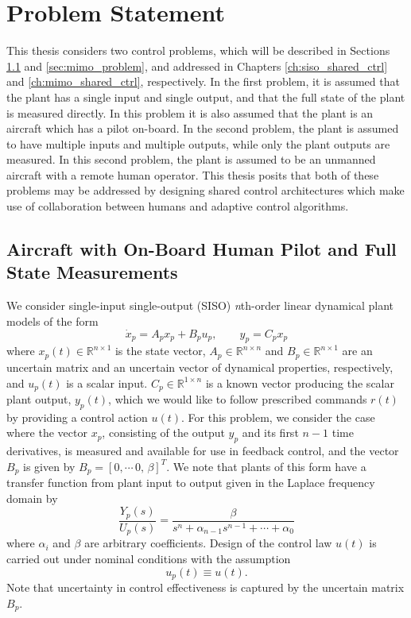 \chapter{Problem Statement} \label{ch:problem}

This thesis considers two control problems, which will be described in Sections \ref{sec:siso_problem} and \ref{sec:mimo_problem}, and addressed in Chapters \ref{ch:siso_shared_ctrl} and \ref{ch:mimo_shared_ctrl}, respectively. In the first problem, it is assumed that the plant has a single input and single output, and that the full state of the plant is measured directly. In this problem it is also assumed that the plant is an aircraft which has a pilot on-board. In the second problem, the plant is assumed to have multiple inputs and multiple outputs, while only the plant outputs are measured. In this second problem, the plant is assumed to be an unmanned aircraft with a remote human operator. This thesis posits that both of these problems may be addressed by designing shared control architectures which make use of collaboration between humans and adaptive control algorithms.

\section{Aircraft with On-Board Human Pilot and Full State Measurements} \label{sec:siso_problem}

We consider single-input single-output (SISO) \textit{n}th-order linear dynamical plant models of the form 
\begin{equation}
\dot x_p = A_p x_p + B_p u_p	, \qquad y_p = C_p x_p \label{eq:siso_plant}
\end{equation} 
\noindent where $x_p(t) \in \mathbb{R}^{n \times 1}$ is the state vector, $A_p \in \mathbb{R}^{n \times n}$ and $B_p \in \mathbb{R}^{n \times 1}$ are an uncertain matrix and an uncertain vector of dynamical properties, respectively, and $u_p(t)$ is a scalar input. $C_p \in \mathbb{R}^{1 \times n}$ is a known vector producing the scalar plant output, $y_p(t)$, which we would like to follow prescribed commands $r(t)$ by providing a control action $u(t)$. For this problem, we consider the case where the vector $x_p$, consisting of the output $y_p$ and its first $n-1$ time derivatives, is measured and available for use in feedback control, and the vector $B_p$ is given by $B_p = [0, \cdots \, 0, \, \beta]^T$. We note that plants of this form have a transfer function from plant input to output given in the Laplace frequency domain by
\begin{equation}
\frac{Y_p(s)}{U_p(s)} = \frac{\beta}{s^n + \alpha_{n-1} s^{n-1} + \cdots + \alpha_0}	
\end{equation}
where $\alpha_i$ and $\beta$ are arbitrary coefficients. Design of the control law $u(t)$ is carried out under nominal conditions with the assumption
\begin{equation}
	u_p(t) \equiv u(t). \label{eq:siso_plant_input_nom}
\end{equation}
Note that uncertainty in control effectiveness is captured by the uncertain matrix $B_p$. 

